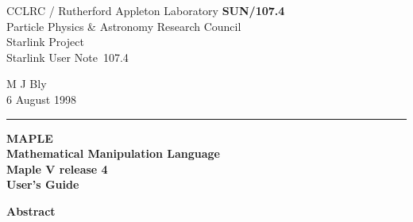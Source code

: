 \documentclass[twoside,11pt]{article}
\newcommand{\stardoccategory}  {Starlink User Note}
\newcommand{\stardocinitials}  {SUN}
\newcommand{\stardocnumber}    {107.4}
\newcommand{\stardocauthors}   {M J Bly}
\newcommand{\stardocdate}      {6 August 1998}
\newcommand{\stardoctitle}     {MAPLE \\[2ex] 
                                Mathematical Manipulation Language}
\newcommand{\stardocversion}   {Maple V release 4}
\newcommand{\stardocmanual}    {User's Guide}
\newcommand{\stardocname}{\stardocinitials /\stardocnumber}
\newenvironment{latexonly}{}{}
\begin{document}
\thispagestyle{empty}

\begin{latexonly}
   CCLRC / {\sc Rutherford Appleton Laboratory} \hfill {\bf \stardocname}\\
   {\large Particle Physics \& Astronomy Research Council}\\
   {\large Starlink Project\\}
   {\large \stardoccategory\ \stardocnumber}
   \begin{flushright}
   \stardocauthors\\
   \stardocdate
   \end{flushright}
   \vspace{-4mm}
   \rule{\textwidth}{0.5mm}
   \vspace{5mm}
   \begin{center}
   {\Huge\bf  \stardoctitle \\ [2.5ex]}
   {\LARGE\bf \stardocversion \\ [4ex]}
   {\Huge\bf  \stardocmanual}
   \end{center}
   \vspace{5mm}


   \vspace{10mm}
   \begin{center}
      {\Large\bf Abstract}
   \end{center}
\end{latexonly}
\end{document}
